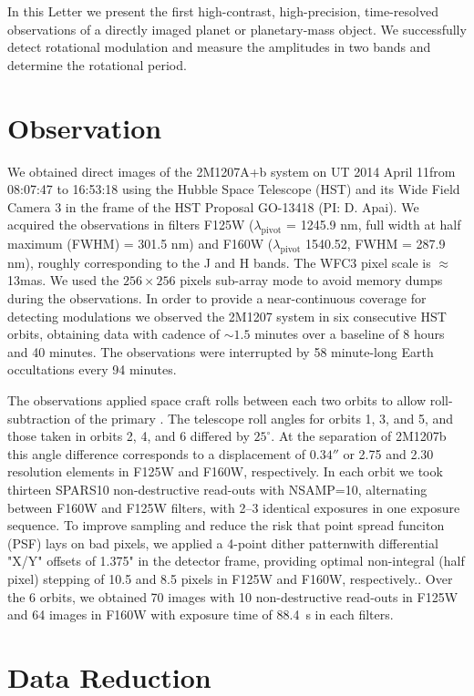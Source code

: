 \documentclass[apj]{emulateapj}
\begin{document}
In this Letter we present the first high-contrast, high-precision,
time-resolved observations of a directly imaged planet or
planetary-mass object. We successfully detect rotational modulation
and measure the amplitudes in two bands and determine the rotational
period.

\section{Observation} We obtained direct images of the 2M1207A+b
system on UT 2014 April 11from 08:07:47 to 16:53:18 using the Hubble
Space Telescope (HST) and its Wide Field Camera 3 \citep[WFC3,
][]{Kimble2008} in the frame of the HST Proposal GO-13418 (PI:
D. Apai). We acquired the observations in filters F125W
($\lambda_{\mbox{pivot}}$ = 1245.9 nm, full width at half maximum
(FWHM) = 301.5 nm) and F160W ($\lambda_{\mbox{pivot}}$ 1540.52, FWHM =
287.9 nm), roughly corresponding to the J and H bands. The WFC3 pixel
scale is $\approx$13mas. We used the $256\times256$ pixels sub-array
mode to avoid memory dumps during the observations.  In order to
provide a near-continuous coverage for detecting modulations we
observed the 2M1207 system in six consecutive HST orbits, obtaining
data with cadence of $\sim1.5$ minutes over a baseline of 8 hours and
40 minutes. The observations were interrupted by 58 minute-long Earth
occultations every 94 minutes.

The observations applied space craft rolls between each two orbits to
allow roll-subtraction of the primary \citep[e.g.][]{Song2006}. The
telescope roll angles for orbits 1, 3, and 5, and those taken in
orbits 2, 4, and 6 differed by $25^{\circ}$. At the separation of
2M1207b this angle difference corresponds to a displacement of
$0.34''$ or 2.75 and 2.30 resolution elements in F125W and F160W,
respectively. In each orbit we took thirteen SPARS10 non-destructive
read-outs with NSAMP=10, alternating between F160W and F125W filters,
with 2--3 identical exposures in one exposure sequence. To improve
sampling and reduce the risk that point spread funciton (PSF) lays on
bad pixels, we applied a 4-point dither patternwith differential "X/Y"
offsets of 1.375" in the detector frame, providing optimal
non-integral (half pixel) stepping of 10.5 and 8.5 pixels in F125W and
F160W, respectively.. Over the 6 orbits, we obtained 70 images with 10
non-destructive read-outs in F125W and 64 images in F160W with
exposure time of 88.4~s in each filters.

\section{Data Reduction}
\end{document}
